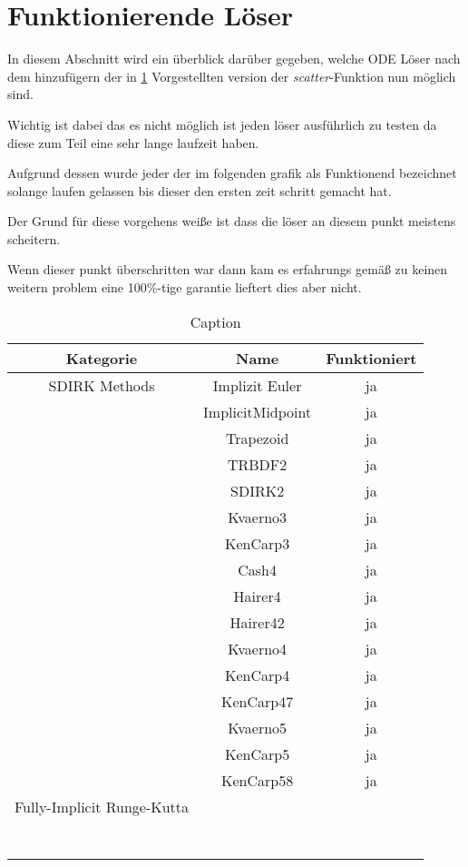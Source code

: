 \section{Funktionierende Löser}

In diesem Abschnitt wird ein überblick darüber gegeben, welche 
ODE Löser nach dem hinzufügern der in \ref{} Vorgestellten 
version der \textit{scatter}-Funktion nun möglich sind.

Wichtig ist dabei das es nicht möglich ist jeden löser ausführlich zu testen
da diese zum Teil eine sehr lange laufzeit haben.

Aufgrund dessen wurde jeder der im folgenden grafik als Funktionend 
bezeichnet solange laufen gelassen bis dieser den ersten zeit schritt gemacht hat.

Der Grund für diese vorgehens weiße ist dass die löser an diesem punkt meistens scheitern.

Wenn dieser punkt überschritten war dann kam es erfahrungs gemäß zu keinen 
weitern problem eine 100\%-tige garantie lieftert dies aber nicht.

\begin{table}[]
    \centering

    \begin{tabular}{c|c|c}
        Kategorie & Name & Funktioniert \\
        \hline\hline
         SDIRK Methods & Implizit Euler & ja \\
         & ImplicitMidpoint & ja\\
         & Trapezoid & ja \\
         & TRBDF2 & ja \\
         & SDIRK2 & ja \\
         & Kvaerno3 & ja \\
         & KenCarp3 & ja \\
         & Cash4 & ja \\
         & Hairer4 & ja \\
         & Hairer42 & ja \\
         & Kvaerno4 & ja \\
         & KenCarp4 & ja \\
         & KenCarp47 & ja \\
         & Kvaerno5 & ja \\
         & KenCarp5 & ja \\
         & KenCarp58 & ja \\
         Fully-Implicit Runge-Kutta & & \\
         & & \\
         & & \\
         & & \\
         & & \\
         & & \\
         & & \\
         & & \\
    \end{tabular}
    \caption{Caption}
    \label{tab:my_label}
\end{table}

